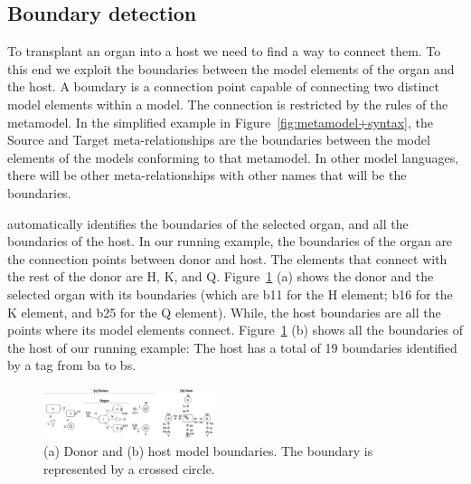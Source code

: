 
\subsection{Boundary detection}
To transplant an organ into a host we need to find a way to connect them. To this end we exploit the boundaries between the model elements of the organ and the host. A boundary is a connection point capable of connecting two distinct model elements within a model. The connection is restricted by the rules of the metamodel. In the simplified example in Figure~\ref{fig:metamodel+syntax}, the Source and Target meta-relationships are the boundaries between the model elements of the models conforming to that metamodel. In other model languages, there will be other meta-relationships with other names that will be the boundaries.

\ApproachName{} automatically identifies the boundaries of the selected organ, and all the boundaries of the host. In our running example, the boundaries of the organ are the connection points between donor and host. The elements that connect with the rest of the donor are H, K, and Q. Figure~\ref{fig:org_bound} (a) shows the donor and the selected organ with its boundaries (which are b11 for the H element; b16 for the K element, and b25 for the Q element). While, the host boundaries are all the points where its model elements connect. Figure~\ref{fig:org_bound} (b) shows all the boundaries of the host of our running example: The host has a total of 19 boundaries identified by a tag from ba to bs.

\begin{figure}[tb]
    \centering
    \includegraphics[width=0.45\textwidth]{Figures/donor+host+boundaries.png}
    \caption{(a) Donor  and (b) host model boundaries. The boundary is represented by a crossed circle.}
    \label{fig:org_bound}
\end{figure}


